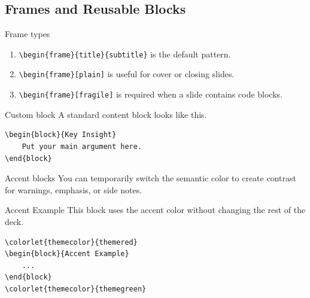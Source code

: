 \documentclass[8pt]{beamer}
\begin{document}
\subsection{Frames and Reusable Blocks}

\begin{frame}[fragile]{\insertsection}{\insertsubsection}

    \begin{block}{Frame types}
        \begin{enumerate}
            \item \lstinline|\begin{frame}{title}{subtitle}| is the default pattern.
            \item \lstinline|\begin{frame}[plain]| is useful for cover or closing slides.
            \item \lstinline|\begin{frame}[fragile]| is required when a slide contains code blocks.
        \end{enumerate}
    \end{block}

    \begin{block}{Custom block}
        A standard content block looks like this.
        \begin{lstlisting}[style=latex]
\begin{block}{Key Insight}
    Put your main argument here.
\end{block}
        \end{lstlisting}
    \end{block}

\end{frame}

\begin{frame}[fragile]{\insertsection}{\insertsubsection}

    \begin{block}{Accent blocks}
        You can temporarily switch the semantic color to create contrast for warnings, emphasis, or side notes.
    \end{block}

    \begin{block}{Accent Example}
        This block uses the accent color without changing the rest of the deck.
        \begin{lstlisting}[style=latex]
\colorlet{themecolor}{themered}
\begin{block}{Accent Example}
    ...
\end{block}
\colorlet{themecolor}{themegreen}
        \end{lstlisting}
    \end{block}

\end{frame}
\end{document}
